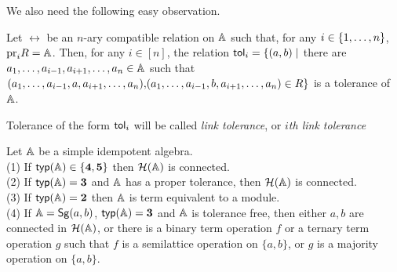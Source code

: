 \documentclass[11pt]{article}
\begin{document}
We also need the following easy observation.
\begin{lemma}\label{lem:binary-tol}
Let $\rel$ be an $n$-ary compatible relation on ${\mathbb A}$ such that, for
any $i\in\{1,\ldots, n\}$, ${\rm pr}_iR={\mathbb A}$. Then, for any $i\in[n]$,
the relation ${\sf tol}_i=\{(a,b)\mid $ there are $a_1,\ldots, a_{i-1},a_{i+1},\ldots,
a_n\in{\mathbb A}$ such that $(a_1\zd a_{i-1},a,a_{i+1}\zd a_n),\lb(a_1\zd
a_{i-1},b,a_{i+1}\zd a_n)\in\rel\}$ is a tolerance of ${\mathbb A}$.
\end{lemma}

Tolerance of the form ${\sf tol}_i$ will be called \emph{link tolerance}, or
\emph{$i$th link tolerance}
\begin{prop}\label{pro:simple}
Let ${\mathbb A}$ be a simple idempotent algebra.\\[2mm]
(1) If ${\sf typ}({\mathbb A})\in\{{\bf4},{\bf5}\}$ then ${\mathcal H}({\mathbb A})$ is connected.\\[2mm]
(2) If ${\sf typ}({\mathbb A})={\bf3}$ and ${\mathbb A}$ has a proper tolerance,
then ${\mathcal H}({\mathbb A})$ is connected.\\[2mm]
(3) If ${\sf typ}({\mathbb A})={\bf2}$ then ${\mathbb A}$ is term equivalent to a module.\\[2mm]
(4) If ${\mathbb A}={\sf Sg}(a,b)$, ${\sf typ}({\mathbb A})={\bf3}$ and ${\mathbb A}$ is tolerance free,
then either $a,b$ are connected in ${\mathcal H}({\mathbb A})$, or there is a binary
term operation $f$ or a ternary term operation $g$ such that $f$ 
is a semilattice operation on $\{a,b\}$, or $g$ is a majority operation
on $\{a,b\}$.
\end{prop}
\end{document}
